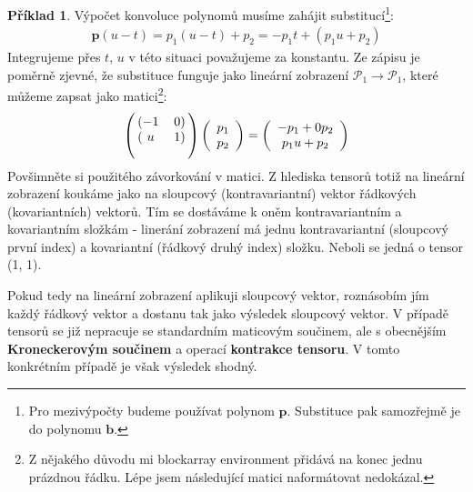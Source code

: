\documentclass[a5paper,12pt]{amsbook}
\theoremstyle{definition}
\newtheorem{example}{Příklad}[chapter]
\newcommand{\myvec}[1]{\mathbf{#1}}
\begin{document}
\begin{example}
\medskip\noindent
Výpočet konvoluce polynomů musíme zahájit substitucí\footnote{
  Pro mezivýpočty budeme používat polynom $\myvec{p}$. Substituce pak samozřejmě
  je do polynomu $\myvec{b}$.
}:
\begin{equation*}
\begin{split}
\myvec{p}(u - t) = p_1(u - t) + p_2 = -p_1t + (p_1 u + p_2)
\end{split}
\end{equation*}
Integrujeme přes $t$, $u$ v této situaci považujeme za konstantu. Ze zápisu
je poměrně zjevné, že substituce funguje jako lineární zobrazení
$\mathcal{P}_1\rightarrow\mathcal{P}_1$, které můžeme zapsat jako matici\footnote{
  Z nějakého důvodu mi blockarray environment přidává na konec jednu prázdnou řádku.
  Lépe jsem následující matici naformátovat nedokázal.
}:
\begin{equation*}
\left(\begin{blockarray}{cc}
\begin{block}{(cc)}
-1 & 0 \\
\end{block}
\begin{block}{(cc)}
 u & 1 \\
\end{block}
\end{blockarray}\right)\left(
\begin{array}{c}
p_1 \\ p_2
\end{array}\right) = \left(
\begin{array}{c}
-p_1 + 0 p_2 \\ p_1 u + p_2
\end{array}
\right)
\end{equation*}
Povšimněte si použitého závorkování v matici. Z hlediska tensorů totiž na lineární
zobrazení koukáme jako na sloupcový (kontravariantní) vektor řádkových (kovariantních)
vektorů. Tím se dostáváme k oněm kontravariantním a kovariantním složkám - linerání
zobrazení má jednu kontravariantní (sloupcový první index) a kovariantní (řádkový
druhý index) složku. Neboli se jedná o tensor (1, 1).

Pokud tedy na lineární zobrazení aplikuji sloupcový vektor, roznásobím jím každý řádkový
vektor a dostanu tak jako výsledek sloupcový vektor. V případě tensorů se již nepracuje
se standardním maticovým součinem, ale s obecnějším \textbf{Kroneckerovým součinem}
a operací \textbf{kontrakce tensoru}. V tomto konkrétním případě je však výsledek
shodný.


\end{example}
\end{document}
